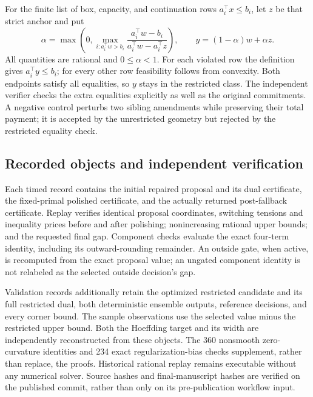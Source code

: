 For the finite list of box, capacity, and continuation rows $a_i^\top x\leq b_i$, let $z$ be that strict anchor and put
\[
 \alpha=\max\left(0,\max_{i:a_i^\top w>b_i}
 \frac{a_i^\top w-b_i}{a_i^\top w-a_i^\top z}\right),\qquad
 y=(1-\alpha)w+\alpha z.
\]
All quantities are rational and $0\leq\alpha<1$. For each violated row the definition gives $a_i^\top y\leq b_i$; for every other row feasibility follows from convexity. Both endpoints satisfy all equalities, so $y$ stays in the restricted class. The independent verifier checks the extra equalities explicitly as well as the original commitments. A negative control perturbs two sibling amendments while preserving their total payment; it is accepted by the unrestricted geometry but rejected by the restricted equality check.

\subsection{Recorded objects and independent verification}
Each timed record contains the initial repaired proposal and its dual certificate, the fixed-primal polished certificate, and the actually returned post-fallback certificate. Replay verifies identical proposal coordinates, switching tensions and inequality prices before and after polishing; nonincreasing rational upper bounds; and the requested final gap. Component checks evaluate the exact four-term identity, including its outward-rounding remainder. An outside gate, when active, is recomputed from the exact proposal value; an ungated component identity is not relabeled as the selected outside decision's gap.

Validation records additionally retain the optimized restricted candidate and its full restricted dual, both deterministic ensemble outputs, reference decisions, and every corner bound. The sample observations use the selected value minus the restricted upper bound. Both the Hoeffding target and its width are independently reconstructed from these objects. The 360 nonsmooth zero-curvature identities and 234 exact regularization-bias checks supplement, rather than replace, the proofs. Historical rational replay remains executable without any numerical solver. Source hashes and final-manuscript hashes are verified on the published commit, rather than only on its pre-publication workflow input.




